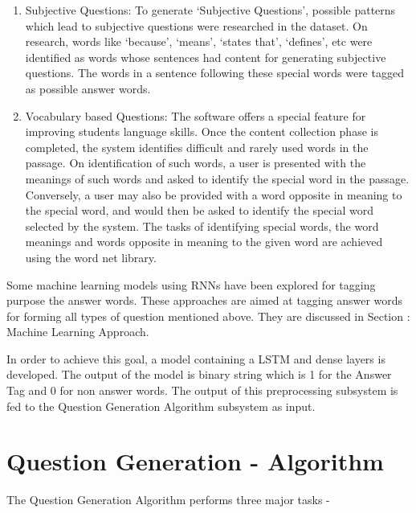 \begin{enumerate}
\begin{enumerate}
	\item Subjective Questions: To generate ‘Subjective Questions’,
	possible patterns which lead to subjective questions were
	researched in the dataset. On research, words like ‘because’,
	‘means’, ‘states that’, ‘defines’, etc were identified as words
	whose sentences had content for generating subjective questions.
	The words in a sentence following these special words were
	tagged as possible answer words.

	\item Vocabulary based Questions: The software offers a
	special feature for improving students language skills. Once the
	content collection phase is completed, the system identifies
	difficult and rarely used words in the passage. On
	identification of such words, a user is presented with the
	meanings of such words and asked to identify the special word in
	the passage. Conversely, a user may also be provided with a word
	opposite in meaning to the special word, and would then be asked
	to identify the special word selected by the system. The tasks
	of identifying special words, the word meanings and words
	opposite in meaning to the given word are achieved using the
	word net library.

	\end{enumerate}

	Some machine learning models using RNNs have been explored for
	tagging purpose the answer words. These approaches are aimed at
	tagging answer words for forming all types of question mentioned
	above. They are discussed in Section : Machine Learning
	Approach.

\end{enumerate}

In order to achieve this goal, a model containing a LSTM and dense layers is
developed. The output of the model is binary string which is 1 for the Answer Tag
and 0 for non answer words. The output of this preprocessing subsystem is fed to the Question Generation Algorithm subsystem as input. 

\section{Question Generation - Algorithm}

The Question Generation Algorithm performs three major tasks - 

